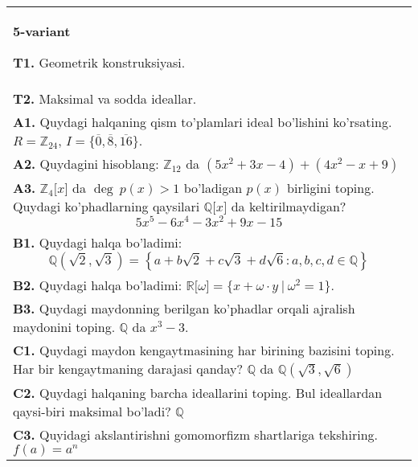 \documentclass{article}
\begin{document}
\begin{tabular}{m{17cm}}
\textbf{5-variant}
\newline

\textbf{T1.} Geometrik konstruksiyasi. \\
\textbf{T2.} Maksimal va sodda ideallar. \\
\textbf{A1.} Quydagi halqaning qism to'plamlari ideal bo'lishini ko'rsating.
\(R = \mathbb{Z}_{24}\), \(I = \{\overline{0},\overline{8},\overline{16}\}\). \\
\textbf{A2.} Quydagini hisoblang:
\(\mathbb{Z}_{12}\) da \(\left( 5x^{2} + 3x - 4 \right) + \left( 4x^{2} - x + 9 \right)\) \\
\textbf{A3.} \(\mathbb{Z}_{4}\lbrack x\rbrack\) da \(\deg\ p(x) > 1\) bo'ladigan \(p(x)\) birligini toping. Quydagi ko'phadlarning qaysilari \(\mathbb{Q\lbrack}x\rbrack\) da keltirilmaydigan?
\[5x^{5} - 6x^{4} - 3x^{2} + 9x - 15\] \\
\textbf{B1.} Quydagi halqa bo'ladimi:
\[\mathbb{Q}\left( \sqrt{2},\sqrt{3} \right) = \left\{ a + b\sqrt{2} + c\sqrt{3} + d\sqrt{6}:a,b,c,d \in \mathbb{Q} \right\}\] \\
\textbf{B2.} Quydagi halqa bo'ladimi:
\(\mathbb{R\lbrack}\omega\rbrack = \{ x + \omega \cdot y\ |\ \omega^{2} = 1\}\). \\
\textbf{B3.} Quydagi maydonning berilgan ko'phadlar orqali ajralish maydonini toping.
\(\mathbb{Q}\) da \(x^{3} - 3\). \\
\textbf{C1.} Quydagi maydon kengaytmasining har birining bazisini toping. Har bir kengaytmaning darajasi qanday?
\(\mathbb{Q}\) da \(\mathbb{Q}\left( \sqrt{3},\sqrt{6} \right)\) \\
\textbf{C2.} Quydagi halqaning barcha ideallarini toping. Bul ideallardan qaysi-biri maksimal bo'ladi? $\mathbb{Q}$ \\
\textbf{C3.} Quyidagi akslantirishni gomomorfizm shartlariga tekshiring. \(f(a) = a^{n}\) \\

\end{tabular}
\vspace{1cm}
\end{document}
